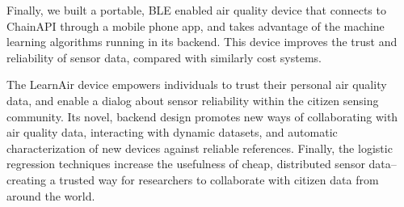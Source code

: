 Finally, we built a portable, BLE enabled air quality device that connects to ChainAPI through a mobile phone app, and takes advantage of the machine learning algorithms running in its backend.  This device improves the trust and reliability of sensor data, compared with similarly cost systems. 

The LearnAir device empowers individuals to trust their personal air quality data, and enable a dialog about sensor reliability within the citizen sensing community.  Its novel, backend design promotes new ways of collaborating with air quality data, interacting with dynamic datasets, and automatic characterization of new devices against reliable references.  Finally, the logistic regression techniques increase the usefulness of cheap, distributed sensor data-- creating a trusted way for researchers to collaborate with citizen data from around the world.